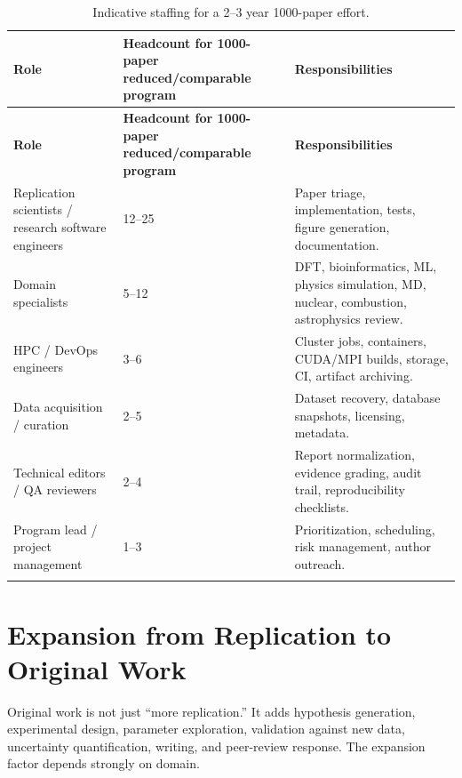 \documentclass[11pt,letterpaper]{article}
\begin{document}
\begin{longtable}{p{4.0cm}p{3.0cm}p{8.0cm}}
\toprule
\textbf{Role} & \textbf{Headcount for 1000-paper reduced/comparable program} & \textbf{Responsibilities} \\
\midrule
\endfirsthead
\toprule
\textbf{Role} & \textbf{Headcount for 1000-paper reduced/comparable program} & \textbf{Responsibilities} \\
\midrule
\endhead
Replication scientists / research software engineers & 12--25 & Paper triage, implementation, tests, figure generation, documentation. \\
Domain specialists & 5--12 & DFT, bioinformatics, ML, physics simulation, MD, nuclear, combustion, astrophysics review. \\
HPC / DevOps engineers & 3--6 & Cluster jobs, containers, CUDA/MPI builds, storage, CI, artifact archiving. \\
Data acquisition / curation & 2--5 & Dataset recovery, database snapshots, licensing, metadata. \\
Technical editors / QA reviewers & 2--4 & Report normalization, evidence grading, audit trail, reproducibility checklists. \\
Program lead / project management & 1--3 & Prioritization, scheduling, risk management, author outreach. \\
\bottomrule
\caption{Indicative staffing for a 2--3 year 1000-paper effort.}
\end{longtable}

\section{Expansion from Replication to Original Work}

Original work is not just ``more replication.'' It adds hypothesis generation, experimental design, parameter exploration, validation against new data, uncertainty quantification, writing, and peer-review response. The expansion factor depends strongly on domain.
\end{document}
